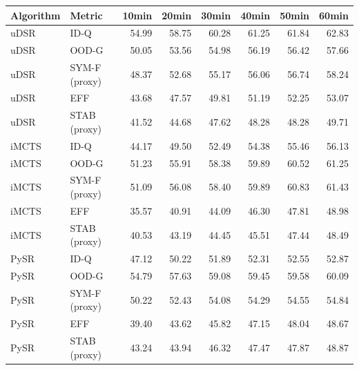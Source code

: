 \begin{tabular}{llrrrrrr}
\toprule
Algorithm & Metric & 10min & 20min & 30min & 40min & 50min & 60min \\
\midrule
uDSR & ID-Q & 54.99 & 58.75 & 60.28 & 61.25 & 61.84 & 62.83 \\
uDSR & OOD-G & 50.05 & 53.56 & 54.98 & 56.19 & 56.42 & 57.66 \\
uDSR & SYM-F (proxy) & 48.37 & 52.68 & 55.17 & 56.06 & 56.74 & 58.24 \\
uDSR & EFF & 43.68 & 47.57 & 49.81 & 51.19 & 52.25 & 53.07 \\
uDSR & STAB (proxy) & 41.52 & 44.68 & 47.62 & 48.28 & 48.28 & 49.71 \\
iMCTS & ID-Q & 44.17 & 49.50 & 52.49 & 54.38 & 55.46 & 56.13 \\
iMCTS & OOD-G & 51.23 & 55.91 & 58.38 & 59.89 & 60.52 & 61.25 \\
iMCTS & SYM-F (proxy) & 51.09 & 56.08 & 58.40 & 59.89 & 60.83 & 61.43 \\
iMCTS & EFF & 35.57 & 40.91 & 44.09 & 46.30 & 47.81 & 48.98 \\
iMCTS & STAB (proxy) & 40.53 & 43.19 & 44.45 & 45.51 & 47.44 & 48.49 \\
PySR & ID-Q & 47.12 & 50.22 & 51.89 & 52.31 & 52.55 & 52.87 \\
PySR & OOD-G & 54.79 & 57.63 & 59.08 & 59.45 & 59.58 & 60.09 \\
PySR & SYM-F (proxy) & 50.22 & 52.43 & 54.08 & 54.29 & 54.55 & 54.84 \\
PySR & EFF & 39.40 & 43.62 & 45.82 & 47.15 & 48.04 & 48.67 \\
PySR & STAB (proxy) & 43.24 & 43.94 & 46.32 & 47.47 & 47.87 & 48.87 \\
\bottomrule
\end{tabular}
